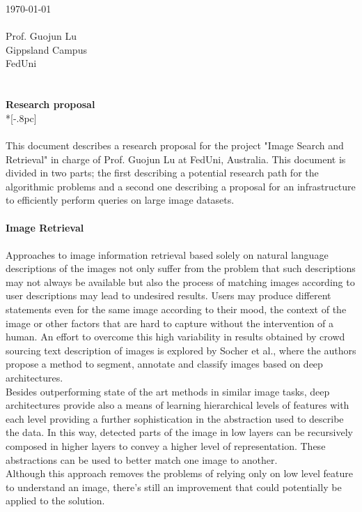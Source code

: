 \documentclass[letter,12pt,english]{article}
\begin{document}
{ \hfill \today \\ \\ 
Prof. Guojun Lu\\
Gippsland Campus\\
FedUni\\
\\
\\

\large
\bf Research proposal} \\*[-.8pc]
\\
\\

This document describes a research proposal for the project "Image Search and Retrieval" in charge of Prof. Guojun Lu
at FedUni, Australia. This document is divided in two parts; the first describing a potential research path for
the algorithmic problems and a second one describing a proposal for an infrastructure to efficiently perform queries
on large image datasets.\\\\
{\bf Image Retrieval}\\\\
Approaches to image information retrieval based solely on natural language descriptions of the images not only suffer
from the problem that such descriptions may not always be available but also the process of matching images according
to user descriptions may lead to undesired results. Users may produce different statements even for the same image
according to their mood, the context of the image or other factors that are hard to capture without the
intervention of a human. An effort to overcome this high variability in results obtained by crowd sourcing text 
description of images is explored by Socher\cite{socher} et al., where the authors propose a method to segment,
annotate and classify images based on deep architectures.\\
Besides outperforming state of the art methods in similar image tasks, deep architectures provide also a means
of learning hierarchical
levels of features with each level providing a further sophistication in the abstraction used to describe the data.
In this way, detected parts of the image in low layers can be recursively composed in higher layers to convey a 
higher level of representation. These abstractions can be used to better match one image to another.\\
Although this approach removes the problems of relying only on low level feature to understand an image, there's
still an improvement that could potentially be applied to the solution.\\
\end{document}
